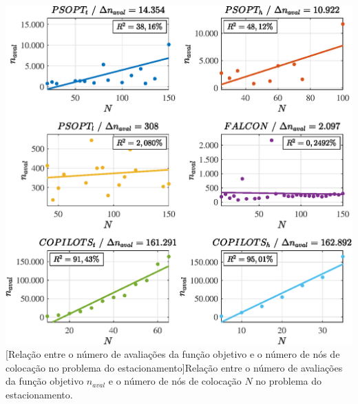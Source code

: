\noindent
\begin{minipage}{\textwidth}
	\vspace{\onelineskip}
	\centering
	\includegraphics[scale=0.7]{fig/resultados/estacionamento/sens/eval}
	[Relação entre o número de avaliações da função objetivo e o número de nós de colocação no problema do estacionamento]{Relação entre o número de avaliações da função objetivo $ n_{aval} $ e o número de nós de colocação $ N $ no problema do estacionamento.}
	\label{fig:estacionamento:sensibilidade:naval}
	\vspace{\onelineskip}
\end{minipage}


